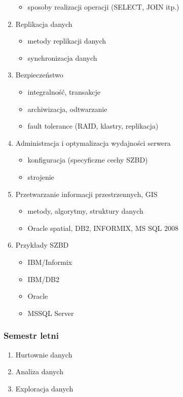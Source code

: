 \documentclass[12pt]{article}
\begin{document}
\begin{enumerate}
\begin{itemize}
\item sposoby realizacji operacji (SELECT, JOIN itp.)
\end{itemize}
\item Replikacja danych
\begin{itemize}
\item metody replikacji danych
\item synchronizacja danych
\end{itemize}
\item Bezpieczeństwo
\begin{itemize}
\item integralność, transakcje
\item archiwizacja, odtwarzanie
\item fault tolerance (\acs{RAID}, klastry, replikacja)
\end{itemize}
\item Administracja i optymalizacja wydajności serwera
\begin{itemize}
\item konfiguracja (specyficzne cechy SZBD)
\item strojenie
\end{itemize}
\item Przetwarzanie informacji przestrzennych, GIS
\begin{itemize}
\item metody, algorytmy, struktury danych
\item Oracle spatial, DB2, INFORMIX, MS SQL 2008
\end{itemize}
\item Przykłady SZBD
\begin{itemize}
\item IBM/Informix
\item IBM/DB2
\item Oracle
\item MSSQL Server
\end{itemize}
\end{enumerate}

\subsubsection{Semestr letni}
\begin{enumerate}
\item Hurtownie danych
\item Analiza danych
\item Exploracja danych
\end{enumerate}
\end{document}
